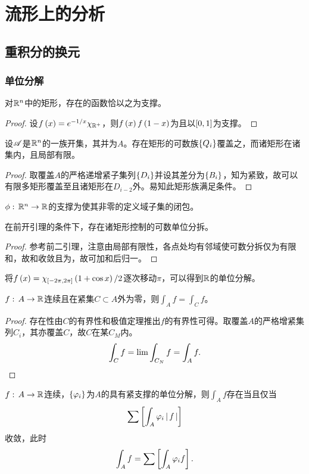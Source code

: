 \documentclass{ctexrep}
\begin{document}
\fi


\chapter{流形上的分析}
  \section{重积分的换元}
  \subsection{单位分解}
  \begin{lemma}
    对$\mathbb{R}^n$中的矩形，存在\cinf 的函数恰以之为支撑。
  \end{lemma}
  \begin{proof}
    设$f\left(x\right)=e^{-1/x}\chi_{\mathbb{R}^+}$，则$f\left(x\right)f\left(1-x\right)$为\cinf 且以$\left[0,1\right]$为支撑。
  \end{proof}
  \begin{lemma}
    设$\mathscr{A}$是$\mathbb{R}^n$的一族开集，其并为$A$。存在矩形的可数族$\left\{Q_i\right\}$覆盖之，而诸矩形在诸集内，且局部有限。
  \end{lemma}
  \begin{proof}
    取覆盖$A$的严格递增紧子集列$\left\{D_i\right\}$并设其差分为$\left\{B_i\right\}$，知为紧致，故可以有限多矩形覆盖至且诸矩形在$D_{i-2}$外。易知此矩形族满足条件。
  \end{proof}
  \begin{definition}
    $\phi:\, \mathbb{R}^n \rightarrow \mathbb{R}$的支撑为使其非零的定义域子集的闭包。
  \end{definition}
  \begin{theorem}[单位分解的存在性]
    在前开引理的条件下，存在诸矩形控制的\cinf 可数单位分拆。
  \end{theorem}
  \begin{proof}
    参考前二引理，注意由局部有限性，各点处均有邻域使可数分拆仅为有限和，故和收敛且为\cinf ，故可加和后归一。
  \end{proof}
  \begin{ex}
    将$f\left(x\right)=\chi_{\left[-2\pi,2\pi\right]}\left(1+\cos x\right)/2$逐次移动$\pi$，可以得到$\mathbb{R}$的\cuno 单位分解。
  \end{ex}
  \begin{lemma}
    $f:\, A \rightarrow \mathbb{R}$连续且在紧集$C\subset A$外为零，则$\int_A f=\int_C f$。
  \end{lemma}
  \begin{proof}
    存在性由$C$的有界性和极值定理推出$f$的有界性可得。取覆盖$A$的严格增紧集列$C_i$，其亦覆盖$C$，故$C$在某$C_M$内。
    \[ \int_C f = \lim \int_{C_N} f = \int_A f. \qedhere \]
  \end{proof}
  \begin{theorem}
    $f:\, A \rightarrow \mathbb{R}$连续，$\left\{\varphi_i\right\}$为$A$的具有紧支撑的单位分解，则$\int_A f$存在当且仅当
    \[ \sum \left[\int_A \varphi_i \left|\, f \,\right|\right] \]
    收敛，此时
    \[ \int_A f = \sum \left[\int_A \varphi_i f\right]. \]
  \end{theorem}


 
\ifx\allfiles\undefined %
\end{document}
